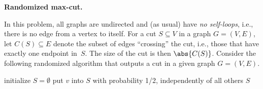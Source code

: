\documentclass[11pt,addpoints,answers]{exam}
\newcommand{\MaxCut}{\textsc{MaxCut}}
\begin{document}
\begin{questions}

  \question \textbf{Randomized max-cut.}

  In this problem, all graphs are undirected and (as usual) have \emph{no self-loops}, i.e., there is no edge from a vertex to itself.
  For a cut $S \subseteq V$ in a graph $G=(V,E)$, let $C(S) \subseteq E$ denote the subset of edges ``crossing'' the cut, i.e., those that have exactly one endpoint in~$S$.
  The size of the cut is then $\abs{C(S)}$.
  Consider the following randomized algorithm that outputs a cut in a given graph $G=(V,E)$.
  
    \begin{algorithm}[H]
      \begin{algorithmic}[1]
        \State initialize $S = \emptyset$
        \State put $v$ into $S$ with probability 1/2, independently of all others
        \EndFor
        \State \Return $S$
      \end{algorithmic}
    \end{algorithm}    
  
\end{questions}
\end{document}
